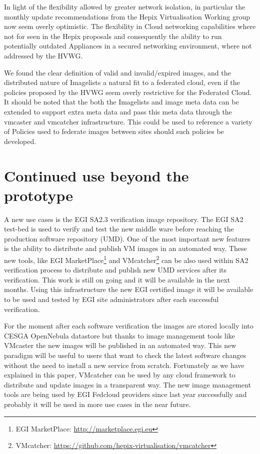 \documentclass{llncs_Ibergrid2013}
\begin{document}
In light of the flexibility allowed by greater network isolation, in particular the monthly update recommendations from the Hepix Virtualisation Working group now seem overly optimistic. The flexibility in Cloud networking capabilities where not for seen in the Hepix proposals and consequently the ability to run potentially outdated Appliances in a secured networking environment, where not addressed by the HVWG.

We found the clear definition of valid and invalid/expired images, and the distributed nature of Imagelists a natural fit to a federated cloud, even if the policies proposed by the HVWG seem overly restrictive for the Federated Cloud. It should be noted that the both the Imagelists and image meta data can be extended to support extra meta data and pass this meta data through the vmcaster and vmcatcher infrastructure. This could be used to reference a variety of Policies used to federate images between sites should such policies be developed.

\section{Continued use beyond the prototype}
\label{sect-continued}

A new use cases is the EGI SA2.3 verification image repository. The EGI SA2 test-bed is used to verify and test the new middle ware before reaching the production software repository (UMD).
One of the most important new features is the ability to distribute and publish VM images in an automated way. 
These new tools, like EGI MarketPlace\footnote{EGI MarketPlace: \url{http://marketplace.egi.eu}} and VMcatcher\footnote{VMcatcher: \url{https://github.com/hepix-virtualisation/vmcatcher}} can be also used within SA2 verification process to distribute and publish new UMD services after its verification. 
This work is still on going and it will be available in the next months. Using this infrastructure the new EGI certified image it will be available to be used and tested by EGI site administrators after each successful verification.

For the moment after each software verification the images are stored locally into CESGA OpenNebula datastore but thanks to image management tools like VMcaster the new images will be published in an automated way.
This new paradigm will be useful to users that want to check the latest software changes without the need to install a new service from scratch.
Fortunately as we have explained in this paper, VMcatcher can be used by any cloud framework to distribute and update images in a transparent way. 
The new image management tools are being used by EGI Fedcloud providers since last year successfully and probably it will be used in more use cases in the near future.
\end{document}
